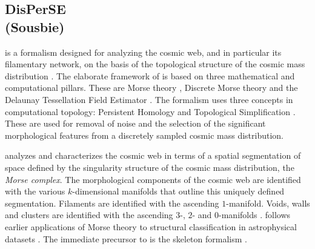 \subsection{DisPerSE \\ \hskip 0.75cm(Sousbie)}
\label{section:Disperse}
\disperse{} is a formalism designed for analyzing the cosmic web, and in particular its filamentary network, 
on the basis of the topological structure of the cosmic mass distribution \citep{sousbie2011,sousbie2011b}. 
The elaborate framework of \disperse{} is based on three mathematical and computational pillars. These are 
Morse theory \citep{morse1934,milnor1963}, Discrete Morse theory \citep{forman1998,gyulassy2008} and the 
Delaunay Tessellation Field Estimator \dtfe{} \citep{schaapwey2000,weyschaap2009,cautun2011}. 
The formalism uses  three concepts in computational 
topology: Persistent Homology and Topological Simplification \citep{edelsbrunner2002,gyulassy2008,edelsbrunner2010}. 
These are used  for removal of noise and the selection of the significant morphological features from a discretely 
sampled cosmic mass distribution. 

\disperse{} analyzes and characterizes the cosmic web in terms of a spatial segmentation of space defined by the  
singularity structure of the cosmic mass distribution, the \emph{Morse complex}. 
The morphological components of the cosmic web are identified with the various $k$-dimensional manifolds that 
outline this uniquely defined segmentation. Filaments are identified with the ascending 
$1$-manifold. Voids, walls and clusters are identified with the ascending $3$-, $2$- and $0$-manifolds 
\citep[also see][]{aragon2010a,shivashankar2016}.  \disperse{} follows earlier 
applications of Morse theory to structural classification in astrophysical datasets \citep[][]{colombi2000}. 
The immediate precursor to \disperse{} is the skeleton formalism \citep{sousbie2008,sousbie2008b,sousbie2009}. 

